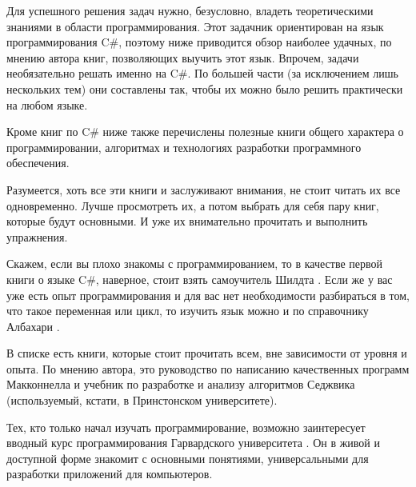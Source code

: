 
Для успешного решения задач нужно, безусловно, владеть теоретическими
знаниями в области программирования. Этот задачник ориентирован на
язык программирования C\#, поэтому ниже приводится обзор наиболее
удачных, по мнению автора книг, позволяющих выучить этот
язык. Впрочем, задачи необязательно решать именно на C\#. По большей
части (за исключением лишь нескольких тем) они составлены так, чтобы
их можно было решить практически на любом языке.

Кроме книг по C\# ниже также перечислены полезные книги общего
характера о программировании, алгоритмах и технологиях разработки
программного обеспечения.

Разумеется, хоть все эти книги и заслуживают внимания, не стоит читать
их все одновременно. Лучше просмотреть их, а потом выбрать для себя
пару книг, которые будут основными. И уже их внимательно прочитать и
выполнить упражнения.

Скажем, если вы плохо знакомы с программированием, то в качестве
первой книги о языке C\#, наверное, стоит взять самоучитель Шилдта
\cite{schildt}. Если же у вас уже есть опыт программирования и для вас
нет необходимости разбираться в том, что такое переменная или цикл, то
изучить язык можно и по справочнику Албахари \cite{albahari}.

В списке есть книги, которые стоит прочитать всем, вне зависимости от
уровня и опыта. По мнению автора, это руководство по написанию
качественных программ Макконнелла \cite{mcconnell} и учебник по
разработке и анализу алгоритмов Седжвика \cite{sedgewick}
(используемый, кстати, в Принстонском университете).

Тех, кто только начал изучать программирование, возможно заинтересует
вводный курс программирования Гарвардского университета
\cite{cs50}. Он в живой и доступной форме знакомит с основными
понятиями, универсальными для разработки приложений для компьютеров.

